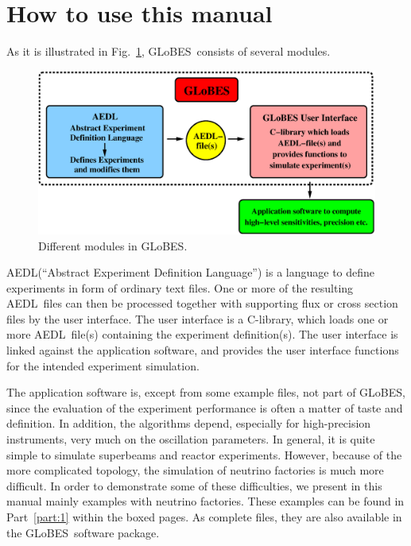 \documentclass[a4paper,12pt,twoside]{book}
\newcommand{\fig}{Fig.}
\newcommand{\Part}{Part}
\newcommand{\GLOBES}{{\sf GLoBES}}
\newcommand{\AEDL}{{\sf AEDL}}
\newcommand{\figu}[1]{\fig~\ref{fig:#1}}
\begin{document}
\cleardoublepage
\tableofcontents

\cleardoublepage
\setcounter{page}{1}

\chapter*{How to use this manual}

As it is illustrated in \figu{GLOBES}, \GLOBES\ consists 
of several modules.
%
\begin{figure}[bht]
\begin{center}
\includegraphics[width=16cm]{GLOBES}
\end{center}
\caption{\label{fig:GLOBES} Different modules in \GLOBES .}
\end{figure}
%
\AEDL (``Abstract Experiment Definition Language'') is a language
to define experiments in form of ordinary text files. One or more of 
the resulting \AEDL\ files can then be processed together with supporting 
flux or cross section files by the user interface. The user interface
is a C-library, which loads one or more \AEDL\ file(s)
containing the experiment definition(s). The user interface is linked 
against the application software, and provides the user interface functions
for the intended experiment simulation. 

The application 
software is, except from some example files, not part of \GLOBES , since
the evaluation of the experiment performance is often a matter of taste
and definition. In addition, the algorithms depend, especially for
high-precision instruments, very much on the oscillation parameters.
In general, it is quite simple to simulate superbeams and reactor
experiments. However, because of the more complicated topology, the
simulation of neutrino factories is much more difficult. In order
to demonstrate some of these difficulties, we present in this manual mainly
examples with neutrino factories. These examples can be found in
\Part~\ref{part:1} within the boxed pages. As complete files, they
are also available in the \GLOBES\ software package.
\end{document}
